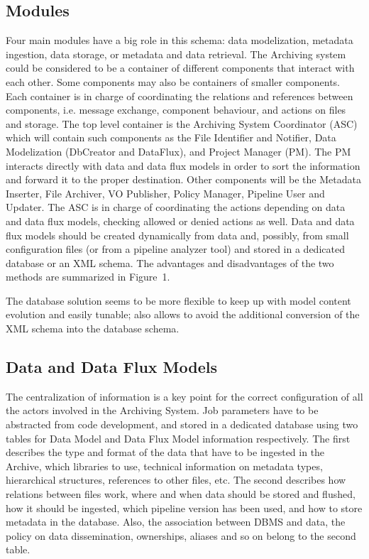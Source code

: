 \subsection{Modules}
Four main modules have a big role in this schema: data modelization,
metadata ingestion, data storage, or metadata and data retrieval.
The Archiving system could be considered to be a container of different components
that interact with each other. Some components may also be containers of smaller
components. Each container is in charge of coordinating the relations and references
between components, i.e. message exchange, component behaviour, and actions on
files and storage. The top level container is the Archiving System Coordinator
(ASC) which will contain such components as the File Identifier and Notifier, Data
Modelization (DbCreator and DataFlux), and Project Manager (PM). The PM interacts
directly with data and data flux models in order to sort the information and
forward it to the proper destination. Other components will be the  Metadata
Inserter, File Archiver, VO Publisher, Policy Manager, Pipeline User and Updater.
The ASC is in charge of coordinating the actions depending on data and data flux
models, checking allowed or denied actions as well. Data and data flux models should
be created dynamically from data and, possibly, from small configuration files (or
from a pipeline analyzer tool) and stored in a dedicated database
or an XML schema. The advantages and disadvantages of the two methods are
summarized in Figure~1.


The database solution seems to be more flexible to keep up with model content
evolution and easily tunable; also allows to avoid the additional conversion
of the XML schema into the database schema.

\subsection{Data and  Data Flux Models}
The centralization of information is a key point for the correct configuration of
all the actors involved in the Archiving System. Job parameters have to be abstracted
from code development, and stored in a dedicated database using two tables for Data
Model and Data Flux Model information respectively. The first describes the type and
format of the data that have to be ingested in the Archive, which libraries to use,
technical information on metadata types, hierarchical structures, references to other
files, etc. The second describes how relations between files work, where and when data
should be stored and flushed, how it should be ingested, which pipeline version has
been used, and how to store metadata in the database. Also, the association between
DBMS and data, the policy on data dissemination, ownerships, aliases and so on belong
to the second table.

